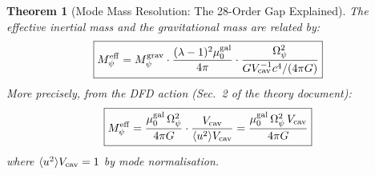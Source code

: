\documentclass[11pt,twocolumn]{article}
\newcommand{\lam}{\lambda}
\newcommand{\Opsi}{\Omega_\psi}
\newcommand{\Meff}{M_\psi^{\rm eff}}
\newcommand{\Mgrav}{M_\psi^{\rm grav}}
\newcommand{\Vcav}{V_{\rm cav}}
\newcommand{\muG}{\mu_0^{\rm gal}}
\newtheorem{theorem}{Theorem}[section]
\begin{document}
\begin{theorem}[Mode Mass Resolution: The 28-Order Gap Explained]
\label{thm:mode_mass_resolution}
The effective inertial mass and the gravitational mass are related by:
\begin{equation}
\boxed{
\Meff = \Mgrav \cdot \frac{(\lam-1)^2 \muG}{4\pi}
       \cdot \frac{\Opsi^2}{G\Vcav^{-1} c^4 / (4\pi G)}
}
\label{eq:Meff_from_Mgrav_schematic}
\end{equation}
More precisely, from the DFD action (Sec.~2 of the theory document):
\begin{equation}
\boxed{
\Meff = \frac{\muG\,\Opsi^2}{4\pi G} \cdot \frac{\Vcav}{\langle u^2\rangle\Vcav}
       = \frac{\muG\,\Opsi^2\,\Vcav}{4\pi G}
}
\label{eq:Meff_derived}
\end{equation}
where $\langle u^2\rangle\Vcav = 1$ by mode normalisation.
\end{theorem}
\end{document}
